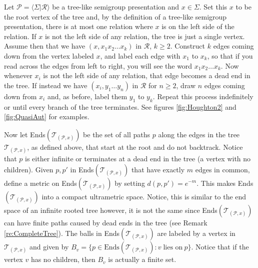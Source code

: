 \documentclass[12pt]{amsart}
\numberwithin{equation}{subsection}
\theoremstyle{definition}
\theoremstyle{definition}
\theoremstyle{remark}
\begin{document}
     Let $\mathcal P = \langle \Sigma \vert \mathcal R\rangle$ be a tree-like semigroup presentation and $x \in \Sigma$. Set this $x$ to be the root vertex of the tree and, by the definition of a tree-like semigroup presentation, there is at most one relation where $x$ is on the left side of the relation. If $x$ is not the left side of any relation, the tree is just a single vertex. Assume then that we have $(x, x_1x_2\dots x_k)$ in $\mathcal R$, $k \geq 2$. Construct $k$ edges coming down from the vertex labeled $x$, and label each edge with $x_1$ to $x_k$, so that if you read across the edges from left to right, you will see the word $x_1x_2\dots x_k$. Now whenever $x_i$ is not the left side of any relation, that edge becomes a dead end in the tree. If instead we have $(x_i,y_1\dots y_n)$ in $\mathcal R$ for $n \geq 2$, draw $n$ edges coming down from $x_i$ and, as before, label them $y_1$ to $y_k$. Repeat this process indefinitely or until every branch of the tree terminates. See figures \ref{fig:Houghton2} and \ref{fig:QuasiAut} for examples. 
     
     Now let Ends$(\mathcal T_{(\mathcal P, x)})$ be the set of all paths $p$ along the edges in the tree $\mathcal T_{(\mathcal P, x)}$, as defined above, that start at the root and do not backtrack. Notice that $p$ is either infinite or terminates at a dead end in the tree (a vertex with no children). Given $p, p'$ in Ends$(\mathcal T_{(\mathcal P, x)})$ that have exactly $m$ edges in common, define a metric on Ends$(\mathcal T_{(\mathcal P, x)})$  by setting  $d(p,p') =e^{-m}$. This makes Ends$(\mathcal T_{(\mathcal P, x)})$ into a compact ultrametric space. Notice, this is similar to the end space of an infinite rooted tree however, it is not the same since Ends$(\mathcal T_{(\mathcal P, x)})$ can have finite paths caused by dead ends in the tree (see Remark \ref{re:CompleteTree}). The balls in Ends$(\mathcal T_{(\mathcal P, x)})$ are labeled by a vertex in $\mathcal T_{(\mathcal P, x)}$ and given by $B_v = \{p \in \text{Ends}(\mathcal T_{(\mathcal P, x)}) : v \; \text{lies on} \: p \}$. Notice that if the vertex $v$ has no children, then $B_v$ is actually a finite set. 
    
\end{document}
